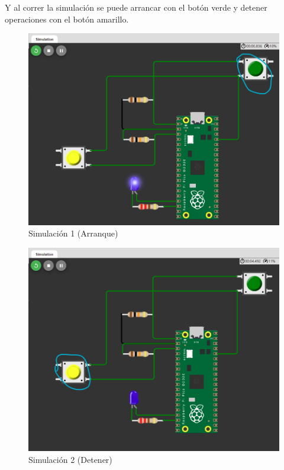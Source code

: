 \documentclass{article}
\begin{document}
    Y al correr la simulación se puede arrancar con el botón verde y detener
    operaciones con el botón amarillo.

    \begin{figure}[H]
        \centering
        \includegraphics[width=0.5\paperwidth]{images/wokwi-example-3-sim-1}
        \caption{Simulación 1 (Arranque)}
    \end{figure}

    \begin{figure}[H]
        \centering
        \includegraphics[width=0.5\paperwidth]{images/wokwi-example-3-sim-2}
        \caption{Simulación 2 (Detener)}
    \end{figure}
\end{document}
